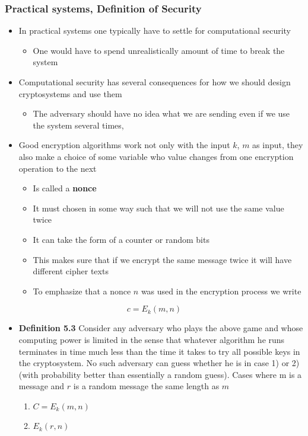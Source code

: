 \documentclass[11pt]{article}
\begin{document}
\subsubsection{Practical systems, Definition of Security}
\label{sec:orgffa9e62}
\begin{itemize}
\item In practical systems one typically have to settle for computational security
\begin{itemize}
\item One would have to spend unrealistically amount of time to break the system
\end{itemize}

\item Computational security  has several consequences for how we should design cryptosystems and use them
\begin{itemize}
\item The adversary should have no idea what we are sending even if we use the system several times,
\end{itemize}
\end{itemize}


\begin{itemize}
\item Good encryption algorithms work not only with the input \(k\), \(m\) as input, they also make a choice of some variable who value changes from one encryption operation to the next
\begin{itemize}
\item Is called a \textbf{nonce}
\item It must chosen in some way such that we will not use the same value twice
\item It can take the form of a counter or random bits
\item This makes sure that if we encrypt the same message twice it will have different cipher texts
\item To emphasize that a nonce \(n\) was used in the encryption process we write
\end{itemize}
\end{itemize}
\begin{equation}
  c = E_k(m,n)
\end{equation}

\begin{itemize}
\item \textbf{Definition 5.3} Consider any adversary who plays the above game and whose computing power is limited in the sense that whatever algorithm he runs terminates in time much less than the time it takes to try all possible keys in the cryptosystem. No such adversary can guess whether he is in case 1) or 2) (with probability better than essentially a random guess). Cases where m is a message and \(r\) is a random message the same length as \(m\)
\begin{enumerate}
\item \(C=E_k(m,n)\)
\item \(E_k(r,n)\)
\end{enumerate}
\end{itemize}
\end{document}
